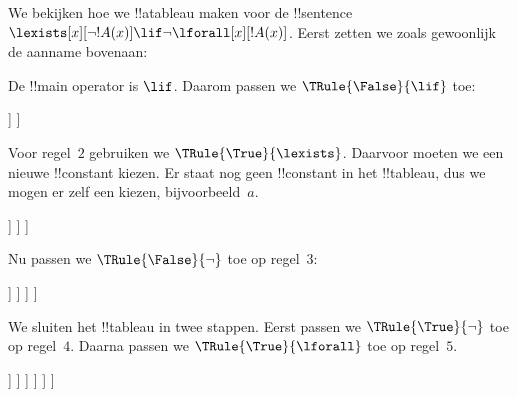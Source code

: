 \documentclass[openany]{memoir}
\begin{document}
\begin{ex}
We bekijken hoe we !!a{tableau} maken voor de !!{sentence}
$\lexists[x][\lnot !A(x)] \lif \lnot \lforall[x][!A(x)]$.
Eerst zetten we zoals gewoonlijk de aanname bovenaan:
\begin{oltableau}
[\sFmla{\False}{\lexists[x][\lnot \formula{A}(x)]\lif \lnot
    \lforall[x][\formula{A}(x)]}, just=\TAss]
\end{oltableau}
De !!{main operator} is $\lif$. Daarom passen we
$\TRule{\False}{\lif}$ toe:
\begin{oltableau}
[\sFmla{\False}{\lexists[x][\lnot \formula{A}(x)]\lif \lnot
    \lforall[x][\formula{A}(x)]}, just=\TAss, checked
  [\sFmla{\True}{\lexists[x][\lnot \formula{A}(x)]},
    just={\TRule{\False}{\lif}[1]}
    [\sFmla{\False}{\lnot\lforall[x][\formula{A}(x)]},
      just={\TRule{\False}{\lif}[1]}]
  ]
]
\end{oltableau}
Voor regel~$2$ gebruiken we $\TRule{\True}{\lexists}$. Daarvoor moeten
we een nieuwe !!{constant} kiezen. Er staat nog geen !!{constant} in
het !!{tableau}, dus we mogen er zelf een kiezen, bijvoorbeeld~$a$.
\begin{oltableau}
[\sFmla{\False}{\lexists[x][\lnot \formula{A}(x)]\lif \lnot
    \lforall[x][\formula{A}(x)]}, just=\TAss, checked
  [\sFmla{\True}{\lexists[x][\lnot \formula{A}(x)]},
    just={\TRule{\False}{\lif}[1]}, checked
    [\sFmla{\False}{\lnot\lforall[x][\formula{A}(x)]},
      just={\TRule{\False}{\lif}[1]}
      [\sFmla{\True}{\lnot\formula{A}(a)}, just={\TRule{\True}{\lexists}[2]}]
    ]
  ]
]
\end{oltableau}
Nu passen we $\TRule{\False}{\lnot}$ toe op regel~$3$:
\begin{oltableau}
[\sFmla{\False}{\lexists[x][\lnot \formula{A}(x)]\lif \lnot
    \lforall[x][\formula{A}(x)]}, just=\TAss, checked
  [\sFmla{\True}{\lexists[x][\lnot \formula{A}(x)]},
    just={\TRule{\False}{\lif}[1]}, checked
    [\sFmla{\False}{\lnot\lforall[x][\formula{A}(x)]},
      just={\TRule{\False}{\lif}[1]}, checked
      [\sFmla{\True}{\lnot\formula{A}(a)}, just={\TRule{\True}{\lexists}[2]}
        [\sFmla{\True}{\lforall[x][\formula{A}(x)]},
          just = {\TRule{\False}{\lnot}[3]}
        ]
      ]
    ]
  ]
]
\end{oltableau}
We sluiten het !!{tableau} in twee stappen. Eerst passen we
$\TRule{\True}{\lnot}$ toe op regel~$4$. Daarna passen we
$\TRule{\True}{\lforall}$ toe op regel~$5$.
\begin{oltableau}
[\sFmla{\False}{\lexists[x][\lnot \formula{A}(x)]\lif \lnot
    \lforall[x][\formula{A}(x)]}, just=\TAss, checked
  [\sFmla{\True}{\lexists[x][\lnot \formula{A}(x)]},
    just={\TRule{\False}{\lif}[1]}, checked
    [\sFmla{\False}{\lnot\lforall[x][\formula{A}(x)]},
      just={\TRule{\False}{\lif}[1]}, checked
      [\sFmla{\True}{\lnot\formula{A}(a)}, just={\TRule{\True}{\lexists}[2]}
        [\sFmla{\True}{\lforall[x][\formula{A}(x)]},
          just = {\TRule{\False}{\lnot}[3]}
          [\sFmla{\False}{\formula{A}(a)}, just={\TRule{\True}{\lnot}[4]}
            [\sFmla{\True}{\formula{A}(a)},
              just={\TRule{\True}{\lforall}[5]}, close
            ]
          ]
        ]
      ]
    ]
  ]
]
\end{oltableau}
\end{ex}
\end{document}
